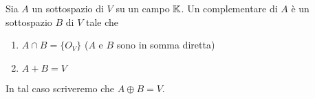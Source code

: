 
\begin{definition}
	Sia $ A $ un sottospazio di $ V $ su un campo $ \mathbb{K} $. Un complementare di $ A $ è un sottospazio $ B $ di $ V $ tale che
	\begin{enumerate}[label=(\roman*)]
		\item $ A \cap B = \{O_V\} $ ($ A $ e $ B $ sono in somma diretta)
		\item $ A + B = V $
	\end{enumerate}
	In tal caso scriveremo che $ A \oplus B = V $. 
\end{definition}
